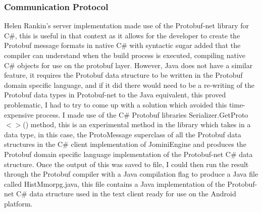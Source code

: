 \documentclass{article}
\begin{document}
\subsubsection{Communication Protocol}

Helen Rankin's server implementation made use of the Protobuf-net library for C\#, this is useful in that context as it allows for the developer to create the Protobuf message formats in native C\# with syntactic sugar added that the compiler can understand when the build process is executed, compiling native C\# objects for use on the protobuf layer. However, Java does not have a similar feature, it requires the Protobuf data structure to be written in the Protobuf domain specific language, and if it did there would need to be a re-writing of the Protobuf data types in Protobuf-net to the Java equivalent, this proved problematic, I had to try to come up with a solution which avoided this time-expensive process. I made use of the C\# Protobuf libraries Serializer.GetProto$<>$() method, this is an experimental method in the library which takes in a data type, in this case, the ProtoMessage superclass of all the Protobuf data structures in the C\# client implementation of JominiEngine and produces the Protobuf domain specific language implementation of the Protobuf-net C\# data structure. Once the output of this was saved to file, I could then run the result through the Protobuf compiler with a Java compilation flag to produce a Java file called HistMmorpg.java, this file contains a Java implementation of the Protobuf-net C\# data structure used in the text client ready for use on the Android platform.
\end{document}
